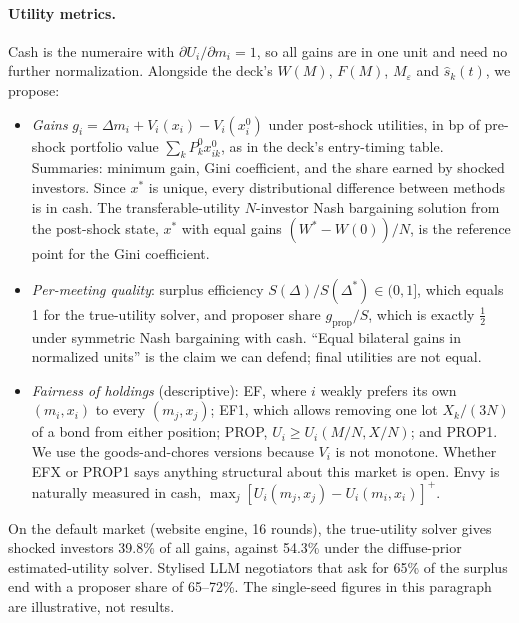 \paragraph{Utility metrics.}
Cash is the numeraire with $\partial U_i/\partial m_i=1$, so all gains are in one unit and need no further normalization. Alongside the deck's $W(M)$, $F(M)$, $M_\varepsilon$ and $\hat s_k(t)$, we propose:
\begin{itemize}
\item \emph{Gains} $g_i=\Delta m_i+V_i(x_i)-V_i(x_i^0)$ under post-shock utilities, in bp of pre-shock portfolio value $\sum_kP^0_kx^0_{ik}$, as in the deck's entry-timing table. Summaries: minimum gain, Gini coefficient, and the share earned by shocked investors. Since $x^*$ is unique, every distributional difference between methods is in cash. The transferable-utility $N$-investor Nash bargaining solution from the post-shock state, $x^*$ with equal gains $(W^*-W(0))/N$, is the reference point for the Gini coefficient.
\item \emph{Per-meeting quality}: surplus efficiency $S(\Delta)/S(\Delta^*)\in(0,1]$, which equals 1 for the true-utility solver, and proposer share $g_{\text{prop}}/S$, which is exactly $\frac12$ under symmetric Nash bargaining with cash. ``Equal bilateral gains in normalized units'' is the claim we can defend; final utilities are not equal.
\item \emph{Fairness of holdings} (descriptive): EF, where $i$ weakly prefers its own $(m_i,x_i)$ to every $(m_j,x_j)$; EF1, which allows removing one lot $X_k/(3N)$ of a bond from either position; PROP, $U_i\ge U_i(M/N,X/N)$; and PROP1. We use the goods-and-chores versions because $V_i$ is not monotone. Whether EFX or PROP1 says anything structural about this market is open. Envy is naturally measured in cash, $\max_j[U_i(m_j,x_j)-U_i(m_i,x_i)]^+$.
\end{itemize}
On the default market (website engine, 16 rounds), the true-utility solver gives shocked investors 39.8\% of all gains, against 54.3\% under the diffuse-prior estimated-utility solver. Stylised LLM negotiators that ask for 65\% of the surplus end with a proposer share of 65--72\%. The single-seed figures in this paragraph are illustrative, not results.

